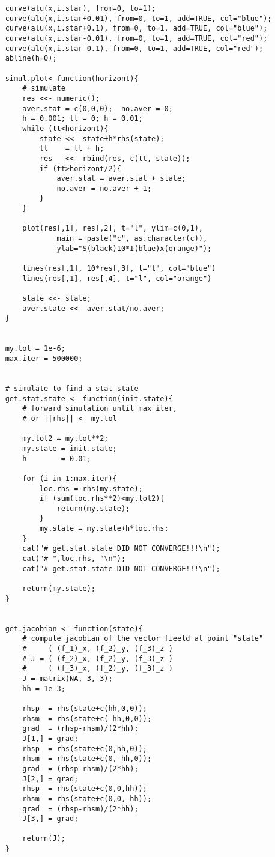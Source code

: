 \begin{lstlisting}
	curve(alu(x,i.star), from=0, to=1);
	curve(alu(x,i.star+0.01), from=0, to=1, add=TRUE, col="blue");
	curve(alu(x,i.star+0.1), from=0, to=1, add=TRUE, col="blue");
	curve(alu(x,i.star-0.01), from=0, to=1, add=TRUE, col="red");
	curve(alu(x,i.star-0.1), from=0, to=1, add=TRUE, col="red");
	abline(h=0);
		
	simul.plot<-function(horizont){
		# simulate
		res <<- numeric();
		aver.stat = c(0,0,0);  no.aver = 0;
		h = 0.001; tt = 0; h = 0.01;
		while (tt<horizont){
			state <<- state+h*rhs(state);
			tt    = tt + h;
			res   <<- rbind(res, c(tt, state));
			if (tt>horizont/2){
				aver.stat = aver.stat + state;
				no.aver = no.aver + 1;
			}
		}
			
		plot(res[,1], res[,2], t="l", ylim=c(0,1), 
				main = paste("c", as.character(c)),
				ylab="S(black)10*I(blue)x(orange)");
			
		lines(res[,1], 10*res[,3], t="l", col="blue")
		lines(res[,1], res[,4], t="l", col="orange")
			
		state <<- state;
		aver.state <<- aver.stat/no.aver;
	}
		
		
	my.tol = 1e-6;
	max.iter = 500000;
		
		
	# simulate to find a stat state
	get.stat.state <- function(init.state){
		# forward simulation until max iter, 
		# or ||rhs|| <- my.tol
			
		my.tol2 = my.tol**2;
		my.state = init.state;
		h        = 0.01;
			
		for (i in 1:max.iter){
			loc.rhs = rhs(my.state);
			if (sum(loc.rhs**2)<my.tol2){
				return(my.state);
			}
			my.state = my.state+h*loc.rhs;
		}
		cat("# get.stat.state DID NOT CONVERGE!!!\n");
		cat("# ",loc.rhs, "\n");
		cat("# get.stat.state DID NOT CONVERGE!!!\n");
			
		return(my.state);
	}
		
		
	get.jacobian <- function(state){
		# compute jacobian of the vector fieeld at point "state"
		#     ( (f_1)_x, (f_2)_y, (f_3)_z )
		# J = ( (f_2)_x, (f_2)_y, (f_3)_z )
		#     ( (f_3)_x, (f_2)_y, (f_3)_z )
		J = matrix(NA, 3, 3);
		hh = 1e-3;
		
		rhsp  = rhs(state+c(hh,0,0));
		rhsm  = rhs(state+c(-hh,0,0));
		grad  = (rhsp-rhsm)/(2*hh);
		J[1,] = grad;
		rhsp  = rhs(state+c(0,hh,0));
		rhsm  = rhs(state+c(0,-hh,0));
		grad  = (rhsp-rhsm)/(2*hh);
		J[2,] = grad;
		rhsp  = rhs(state+c(0,0,hh));
		rhsm  = rhs(state+c(0,0,-hh));
		grad  = (rhsp-rhsm)/(2*hh);
		J[3,] = grad;
		
		return(J);
	}
		

\end{lstlisting}
